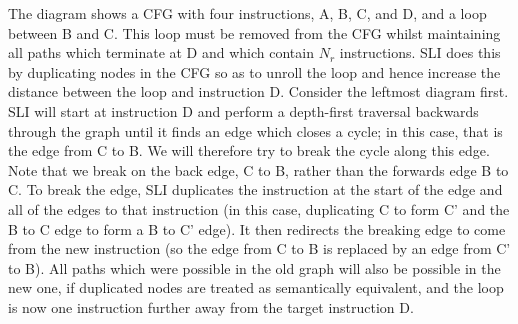\documentclass[12pt,a4paper]{book}
\begin{document}

The diagram shows a CFG with four instructions, A, B, C, and D, and a loop between B and C.
This loop must be removed from the CFG whilst maintaining all paths which terminate at D and which contain $N_r$ instructions.
SLI does this by duplicating nodes in the CFG so as to unroll the loop and hence increase the distance between the loop and instruction D.
Consider the leftmost diagram first.
SLI will start at instruction D and perform a depth-first traversal backwards through the graph until it finds an edge which closes a cycle; in this case, that is the edge from C to B.
We will therefore try to break the cycle along this edge.
Note that we break on the back edge, C to B, rather than the forwards edge B to C.
To break the edge, SLI duplicates the instruction at the start of the edge and all of the edges to that instruction (in this case, duplicating C to form C' and the B to C edge to form a B to C' edge).
It then redirects the breaking edge to come from the new instruction (so the edge from C to B is replaced by an edge from C' to B).
All paths which were possible in the old graph will also be possible in the new one, if duplicated nodes are treated as semantically equivalent, and the loop is now one instruction further away from the target instruction D.
\end{document}
